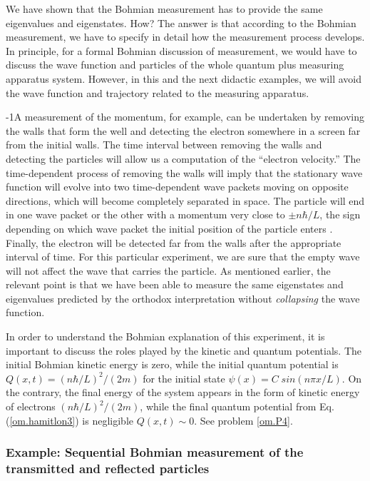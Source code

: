 \documentclass[onecolumn,nofootinbib, secnumarabic, amsmath, nobibnotes,11pt,aps,pra]{revtex4-1}
\newcommand{\eref}[1]{Eq. (\ref{#1})}
\begin{document}
We have shown that the Bohmian measurement has to provide the same
eigenvalues and eigenstates. How? The answer is that according to
the Bohmian measurement, we have to specify in detail how the
measurement process develops. In principle, for a formal Bohmian
discussion of measurement, we would have to discuss the wave
function and particles of the whole quantum plus measuring apparatus system. However, in this and the next didactic examples,
we will avoid the wave function and trajectory related to the
measuring apparatus.

\looseness-1A measurement of the momentum, for example, can be undertaken by
removing the walls that form the well and detecting the electron
somewhere in a screen far from the initial walls. The time interval
between removing the walls and detecting the particles will allow us
a computation of the ``electron velocity.'' The time-dependent
process of removing the walls will imply that the stationary wave
function will evolve into two time-dependent wave packets moving on
opposite directions, which will become completely separated in
space. The particle will end in one wave packet or the other with a
momentum very close to $\pm n \hbar/L$, the sign depending on which
wave packet the initial position of the particle enters
\cite{om.bohm1952b}. Finally, the electron will be detected far from
the walls after the appropriate interval of time. For this
particular experiment, we are sure that the empty wave will not
affect the wave that carries the particle. As mentioned earlier, the
relevant point is that we have been able to measure the same
eigenstates and eigenvalues predicted by the orthodox interpretation
without \textit{collapsing} the wave function.

In order to understand the Bohmian explanation of this experiment, it is important to discuss the roles played by the kinetic and quantum potentials. The initial Bohmian kinetic energy is zero, while the initial quantum potential is $Q(x,t) = (n\hbar/L)^{2}/(2m)$ for the initial state $\psi(x) = C \; sin(n \pi x/L)$. On the contrary, the final energy of the system appears in the form of kinetic energy of electrons $(n\hbar/L)^{2}/(2m)$, while the final quantum potential from \eref{om.hamitlon3} is negligible $Q(x,t)\sim 0$. See problem \ref{om.P4}.

\enlargethispage{13pt}
\subsubsection{Example: Sequential Bohmian measurement of the transmitted and reflected particles}
\label{om.measure_transmission}
\end{document}
